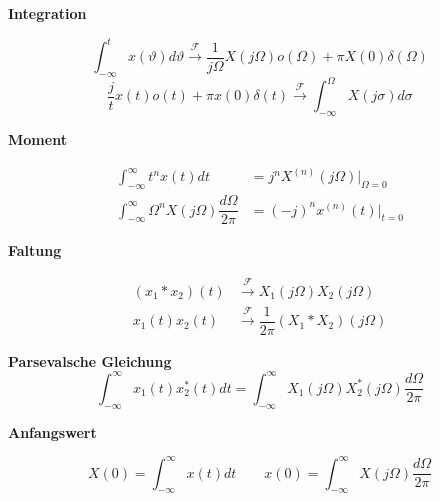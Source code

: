 \documentclass[10pt,a4paper]{article}
\newcommand{\fancyformula}[2]{
	\small
	\raggedright\sffamily\textbf{#1}
	#2
}
\newcommand{\ftransform}{
	\xrightarrow{~\mathcal{F}~}
}
\begin{document}
\begin{multicols}{2}
{}
\fancyformula{Integration}{
	\[\int_{-\infty}^{t}x(\vartheta)d\vartheta \ftransform \dfrac{1}{j\Omega} X(j\Omega) o(\Omega)+\pi X(0)\delta(\Omega)\]
	\[\dfrac{j}{t}x(t)o(t)+\pi x(0) \delta(t)  \ftransform \int_{-\infty}^{\Omega}X(j\sigma)d\sigma \]
}
\fancyformula{Moment}{
\begin{align*}
	\int_{-\infty}^{\infty}t^n x(t)dt &= j^n X^{(n)}(j\Omega)|_{\Omega=0} \\
	\int_{-\infty}^{\infty}\Omega^n X(j\Omega)\dfrac{d\Omega}{2\pi}&=(-j)^n x^{(n)}(t)|_{t=0}
\end{align*}	
}
\fancyformula{Faltung}{
\begin{align*}
	(x_1 \ast x_2)(t) &\ftransform X_1(j\Omega)X_2(j\Omega)\\
	x_1(t)x_2(t) &\ftransform \dfrac{1}{2\pi} (X_1 \ast X_2)(j\Omega)
\end{align*}
}
\fancyformula{Parsevalsche Gleichung}{\[ \int_{-\infty}^{\infty}x_1(t)x_2^*(t)dt=\int_{-\infty}^{\infty}X_1(j\Omega)X_2^*(j\Omega)\dfrac{d\Omega}{2\pi} \]}
\fancyformula{Anfangswert}{
	\[ X(0)=\int_{-\infty}^{\infty}x(t)dt\qquad x(0)=\int_{-\infty}^{\infty}X(j\Omega)\dfrac{d\Omega}{2\pi} \]	
}
\end{multicols}
\end{document}
